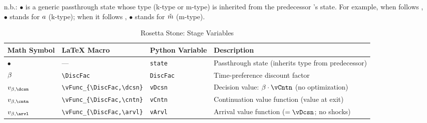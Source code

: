 \begin{table}[h]\caption{Discounting {\Stg} ($\DiscFac$) {\Prchs}}\label{tab:prchs-disc}
\newsavebox{\disctablebox}%
\begin{center}
    \usebox{\disctablebox}

    \parbox{\wd\disctablebox}{\footnotesize n.b.: $\bullet$ is a generic passthrough state whose type (k-type or m-type) is inherited from the predecessor {\stg}'s {\Continuation} state.  For example, when  follows , $\bullet$ stands for $a$ (k-type); when it follows , $\bullet$ stands for $\check{m}$ (m-type).}
  \end{center}
  \end{table}

\begin{table}[h]
\caption{Rosetta Stone:  Stage Variables}
\label{tab:rosetta-disc}
\begin{center}
\begin{tabular}{l|l|l|l}
Math Symbol & \LaTeX{} Macro & Python Variable & Description \\
\hline
$\bullet$                    & ---                          & \texttt{state}       & Passthrough state (inherits type from predecessor) \\
$\DiscFac$                   & \verb|\DiscFac|              & \texttt{DiscFac}     & Time-preference discount factor \\
$\vFunc_{\DiscFac,\dcsn}$    & \verb|\vFunc_{\DiscFac,\dcsn}| & \texttt{vDcsn}    & Decision value: $\DiscFac \cdot \vCntn$ (no optimization) \\
$\vFunc_{\DiscFac,\cntn}$    & \verb|\vFunc_{\DiscFac,\cntn}| & \texttt{vCntn}    & Continuation value function (value at exit) \\
$\vFunc_{\DiscFac,\arvl}$    & \verb|\vFunc_{\DiscFac,\arvl}| & \texttt{vArvl}    & Arrival value function ($= \vDcsn$; no shocks) \\
\hline
\end{tabular}
\end{center}
\end{table}

